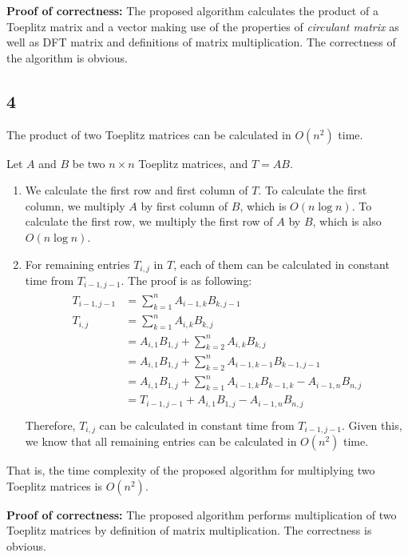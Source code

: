 \documentclass[paper=a4, fontsize=11pt]{scrartcl} %
\numberwithin{equation}{section} %
\numberwithin{figure}{section} %
\numberwithin{table}{section} %
\numberwithin{claimcounter}{section}
\begin{document}
\textbf{Proof of correctness:}
The proposed algorithm calculates the product of a Toeplitz matrix and a vector
making use of the properties of \textit{circulant matrix} as well as 
DFT matrix and definitions of matrix multiplication. The correctness of the 
algorithm is obvious.

\subsection*{4}
The product of two Toeplitz matrices can be calculated in $O(n^2)$ time.

Let $A$ and $B$ be two $n\times n$ Toeplitz matrices, and $T = AB$. 
\begin{enumerate}
  \item We calculate the first row and first column of $T$. To calculate the
    first column, we multiply $A$ by first column of $B$, which is $O(n\log n)$.
    To calculate the first row, we multiply the first row of $A$ by $B$, which
    is also $O(n\log n)$.
  \item For remaining entries $T_{i,j}$ in $T$, each of them can be calculated in constant 
    time from $T_{i-1, j-1}$. The proof is as following:
      \begin{align}
        \begin{split}
          T_{i-1, j-1} &= \sum_{k=1}^{n} A_{i-1, k} B_{k,j-1} \\
          T_{i, j} &= \sum_{k=1}^{n} A_{i, k} B_{k, j} \\
                &= A_{i,1}B_{1,j} + \sum_{k=2}^{n} A_{i, k} B_{k, j} \\
                &= A_{i,1}B_{1,j} + \sum_{k=2}^n A_{i-1, k-1} B_{k-1, j-1} \\
                &= A_{i,1}B_{1,j} + \sum_{k=1}^n A_{i-1, k} B_{k-1, k} -
                A_{i-1, n}B_{n,j} \\
                &= T_{i-1, j-1} + A_{i,1}B_{1,j} - A_{i-1, n}B_{n,j} \\
        \end{split}
      \end{align}
    Therefore, $T_{i, j}$ can be calculated in constant time from $T_{i-1,j-1}$.
    Given this, we know that all remaining entries can be calculated in $O(n^2)$
    time.
\end{enumerate}
That is, the time complexity of the proposed algorithm for multiplying two
Toeplitz matrices is $O(n^2)$.

\textbf{Proof of correctness:} The proposed algorithm performs multiplication 
of two Toeplitz matrices by definition of matrix multiplication. The correctness
is obvious.
\end{document}
